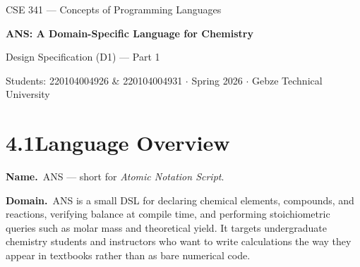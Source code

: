 \documentclass[11pt,a4paper]{article}
\begin{document}
\begin{center}
  {\footnotesize\color{anscaption}
    CSE 341 --- Concepts of Programming Languages\par}
  \vspace{2pt}
  {\Huge\bfseries\sffamily\color{ansblue}
    ANS: A Domain-Specific Language for Chemistry\par}
  \vspace{4pt}
  {\normalsize Design Specification (D1) --- Part 1\par}
  {\footnotesize\color{anscaption}
    Students: 220104004926 \& 220104004931 \quad$\cdot$\quad
    Spring 2026 \quad$\cdot$\quad
    Gebze Technical University\par}
\end{center}
\vspace{6pt}

\section{4.1\quad Language Overview}

\textbf{Name.}\, ANS --- short for \textit{Atomic Notation Script}.

\textbf{Domain.}\, ANS is a small DSL for declaring chemical elements,
compounds, and reactions, verifying balance at compile time, and performing
stoichiometric queries such as molar mass and theoretical yield. It targets
undergraduate chemistry students and instructors who want to write
calculations the way they appear in textbooks rather than as bare numerical
code.
\end{document}
